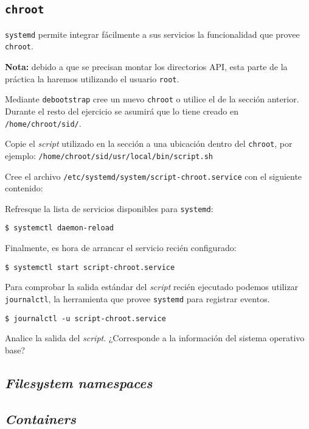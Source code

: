 \subsection{\texttt{chroot}}
\texttt{systemd} permite integrar fácilmente a sus servicios la
funcionalidad que provee \texttt{chroot}.

\textbf{Nota:} debido a que se precisan montar los directorios API, esta
parte de la práctica la haremos utilizando el usuario \texttt{root}.
\begin{questions}
  \question Mediante \texttt{debootstrap} cree un nuevo \texttt{chroot} o
  utilice el de la sección anterior. Durante el resto del ejercicio se
  asumirá que lo tiene creado en \texttt{/home/chroot/sid/}.

  \question Copie el \textit{script} utilizado en la sección a una
  ubicación dentro del \texttt{chroot}, por ejemplo:
  \texttt{/home/chroot/sid/usr/local/bin/script.sh}

  \question Cree el archivo
  \texttt{/etc/systemd/system/script-chroot.service} con el siguiente
  contenido:

  

  \question Refresque la lista de servicios disponibles para
  \texttt{systemd}:
  \begin{verbatim}
$ systemctl daemon-reload
\end{verbatim}

    \question Finalmente, es hora de arrancar el servicio recién configurado:
\begin{verbatim}
$ systemctl start script-chroot.service
\end{verbatim}

    \question Para comprobar la salida estándar del \textit{script} recién
    ejecutado podemos utilizar \texttt{journalctl}, la herramienta que
    provee \texttt{systemd} para registrar eventos.
\begin{verbatim}
$ journalctl -u script-chroot.service
\end{verbatim}

    Analice la salida del \textit{script}. ¿Corresponde a la información
    del sistema operativo base?   

\end{questions}

\subsection{\textit{Filesystem namespaces}}

\subsection{\textit{Containers}}